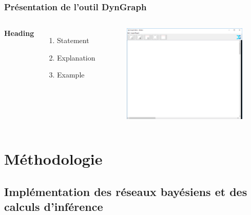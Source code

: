 \documentclass{beamer}
\begin{document}
\begin{frame}
\frametitle{Présentation de l'outil DynGraph}
\begin{columns}[c] %

\textbf{Heading}
\begin{enumerate}
\item Statement
\item Explanation
\item Example
\end{enumerate}

\begin{figure}
\includegraphics[width=1.0\linewidth]{Dyngraph.png}
\end{figure}
\end{columns}
\end{frame}


\section{Méthodologie}

	\subsection{Implémentation des réseaux bayésiens et des calculs d'inférence }
	
\end{document}
